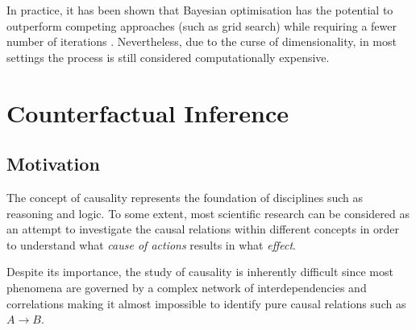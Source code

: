 In practice, it has been shown that Bayesian optimisation has the potential to outperform competing approaches (such as grid search) while requiring a fewer number of iterations \cite{bayesian-optimisation-results}. Nevertheless, due to the curse of dimensionality, in most settings the process is still considered computationally expensive. 


%

%

\section{Counterfactual Inference} \label{sec:counterfactual-inference}

\subsection{Motivation}
The concept of causality represents the foundation of disciplines such as reasoning and logic. To some extent, most scientific research can be considered as an attempt to investigate the causal relations within different concepts in order to understand what \emph{cause of actions} results in  what \emph{effect}.

Despite its importance, the study of causality is inherently difficult since most phenomena are governed by a complex network of interdependencies and correlations making it almost impossible to identify pure causal relations such as $A \rightarrow B$.  

